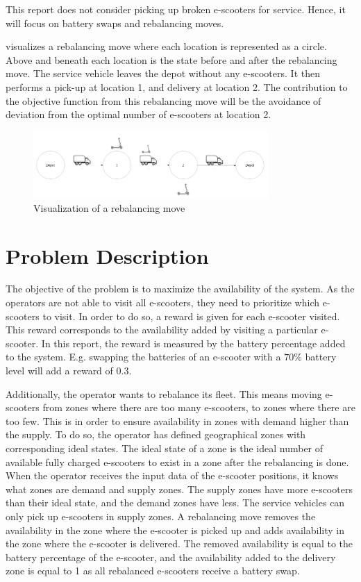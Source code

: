 This report does not consider picking up broken e-scooters for service. Hence, it will focus on battery swaps and rebalancing moves.

 visualizes a rebalancing move where each location is represented as a circle. Above and beneath each location is the state before and after the rebalancing move. The service vehicle leaves the depot without any e-scooters. It then performs a pick-up at location 1, and delivery at location 2. The contribution to the objective function from this rebalancing move will be the avoidance of deviation from the optimal number of e-scooters at location 2.

\begin{figure}[H]
    \centering
    \includegraphics[width=0.8\textwidth]{Images/Visualisering av problem.jpg}
    \caption{Visualization of a rebalancing move}
    \label{fig:rebalancing_visualization}
\end{figure}

\section{Problem Description}\label{Problem Description}

The objective of the problem is to maximize the availability of the system. As the operators are not able to visit all e-scooters, they need to prioritize which e-scooters to visit. In order to do so, a reward is given for each e-scooter visited. This reward corresponds to the availability added by visiting a particular e-scooter. In this report, the reward is measured by the battery percentage added to the system. E.g. swapping the batteries of an e-scooter with a $70 \%$ battery level will add a reward of $0.3$. 

Additionally, the operator wants to rebalance its fleet. This means moving e-scooters from zones where there are too many e-scooters, to zones where there are too few. This is in order to ensure availability in zones with demand higher than the supply. To do so, the operator has defined geographical zones with corresponding ideal states. The ideal state of a zone is the ideal number of available fully charged e-scooters to exist in a zone after the rebalancing is done. When the operator receives the input data of the e-scooter positions, it knows what zones are demand and supply zones. The supply zones have more e-scooters than their ideal state, and the demand zones have less. The service vehicles can only pick up e-scooters in supply zones. A rebalancing move removes the availability in the zone where the e-scooter is picked up and adds availability in the zone where the e-scooter is delivered. The removed availability is equal to the battery percentage of the e-scooter, and the availability added to the delivery zone is equal to 1 as all rebalanced e-scooters receive a battery swap. 

